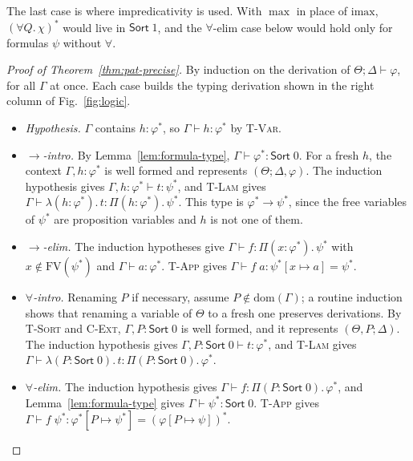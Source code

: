 \documentclass[acmsmall,screen,nonacm]{acmart}
\newcommand{\Sort}[1]{\mathsf{Sort}\;#1}
\newcommand{\tPi}[3]{\Pi(#1{:}#2).\,#3}
\newcommand{\tLam}[3]{\lambda(#1{:}#2).\,#3}
\newcommand{\subst}[3]{#1[#2 \mapsto #3]}
\newcommand{\FV}{\mathrm{FV}}
\newcommand{\dom}{\mathrm{dom}}
\newcommand{\imax}{\mathrm{imax}}
\begin{document}
\noindent The last case is where impredicativity is used. With $\max$ in place of $\imax$, $(\forall Q.\,\chi)^\ast$ would live in $\Sort{1}$,
and the $\forall$-elim case below would hold only for formulas $\psi$ without $\forall$.

\begin{proof}[Proof of Theorem~\ref{thm:pat-precise}]
By induction on the derivation of $\Theta; \Delta \vdash \varphi$, for all $\Gamma$ at once.
Each case builds the typing derivation shown in the right column of Fig.~\ref{fig:logic}.
\begin{itemize}
  \item \emph{Hypothesis.} $\Gamma$ contains $h : \varphi^\ast$, so $\Gamma \vdash h : \varphi^\ast$ by \textsc{T-Var}.
  \item \emph{$\to$-intro.} By Lemma~\ref{lem:formula-type}, $\Gamma \vdash \varphi^\ast : \Sort{0}$.
    For a fresh $h$, the context $\Gamma, h : \varphi^\ast$ is well formed and represents $(\Theta; \Delta, \varphi)$.
    The induction hypothesis gives $\Gamma, h : \varphi^\ast \vdash t : \psi^\ast$,
    and \textsc{T-Lam} gives $\Gamma \vdash \tLam{h}{\varphi^\ast}{t} : \tPi{h}{\varphi^\ast}{\psi^\ast}$.
    This type is $\varphi^\ast \to \psi^\ast$, since the free variables of $\psi^\ast$ are proposition variables and $h$ is not one of them.
  \item \emph{$\to$-elim.} The induction hypotheses give $\Gamma \vdash f : \tPi{x}{\varphi^\ast}{\psi^\ast}$ with $x \notin \FV(\psi^\ast)$ and $\Gamma \vdash a : \varphi^\ast$.
    \textsc{T-App} gives $\Gamma \vdash f\;a : \subst{\psi^\ast}{x}{a} = \psi^\ast$.
  \item \emph{$\forall$-intro.} Renaming $P$ if necessary, assume $P \notin \dom(\Gamma)$;
    a routine induction shows that renaming a variable of $\Theta$ to a fresh one preserves derivations.
    By \textsc{T-Sort} and \textsc{C-Ext}, $\Gamma, P : \Sort{0}$ is well formed, and it represents $(\Theta, P; \Delta)$.
    The induction hypothesis gives $\Gamma, P : \Sort{0} \vdash t : \varphi^\ast$,
    and \textsc{T-Lam} gives $\Gamma \vdash \tLam{P}{\Sort{0}}{t} : \tPi{P}{\Sort{0}}{\varphi^\ast}$.
  \item \emph{$\forall$-elim.} The induction hypothesis gives $\Gamma \vdash f : \tPi{P}{\Sort{0}}{\varphi^\ast}$,
    and Lemma~\ref{lem:formula-type} gives $\Gamma \vdash \psi^\ast : \Sort{0}$.
    \textsc{T-App} gives $\Gamma \vdash f\;\psi^\ast : \subst{\varphi^\ast}{P}{\psi^\ast} = (\subst{\varphi}{P}{\psi})^\ast$. \qedhere
\end{itemize}
\end{proof}
\end{document}
